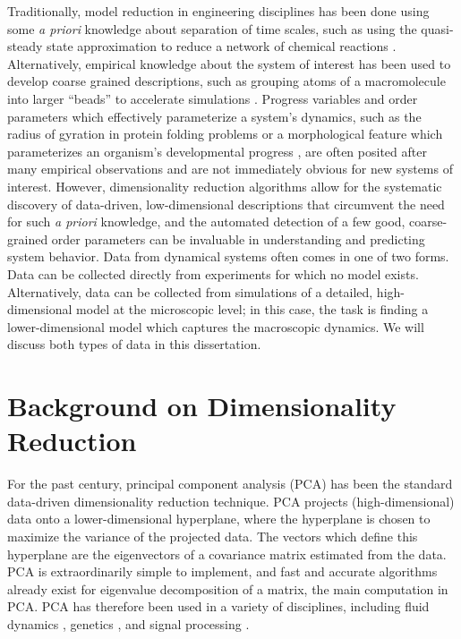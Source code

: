 Traditionally, model reduction in engineering disciplines has been done using some {\em a priori} knowledge about separation of time scales,
such as using the quasi-steady state approximation to reduce a network of chemical reactions \cite{bowen1963singular}.
%
Alternatively, empirical knowledge about the system of interest has been used to develop coarse grained descriptions, such as grouping atoms of a macromolecule into larger ``beads'' to accelerate simulations \cite{izvekov2005systematic, monticelli2008martini, saunders2013coarse, spiga2013electrostatic}.
%
Progress variables and order parameters which effectively parameterize a system's dynamics, such as the radius of gyration in protein folding problems \cite{lazaridis1997new, kim2015systematic} or a  morphological feature which parameterizes an organism's developmental progress \cite{dubuis2013accurate, hamaratoglu2011dpp}, are often posited after many empirical observations and are not immediately obvious for new systems of interest.
%
However, dimensionality reduction algorithms allow for the systematic discovery of data-driven, low-dimensional descriptions that circumvent the need for such {\em a priori} knowledge, and the automated detection of a few good, coarse-grained
order parameters can be invaluable in understanding and predicting system behavior.
%
%
Data from dynamical systems often comes in one of two forms.
%
Data can be collected directly from experiments for which no model exists.
%
Alternatively, data can be collected from simulations of a detailed, high-dimensional model at the microscopic level; in this case, the task is finding a lower-dimensional model which captures the macroscopic dynamics.
%
We will discuss both types of data in this dissertation.

\section{Background on Dimensionality Reduction} \label{sec:background}


For the past century, principal component analysis (PCA) \cite{shlens2005tutorial} has been the standard data-driven dimensionality reduction technique.
%
PCA projects (high-dimensional) data onto a lower-dimensional hyperplane, where the hyperplane is chosen to maximize the variance of the projected data.
%
The vectors which define this hyperplane are the eigenvectors of a covariance matrix estimated from the data.
%
PCA is extraordinarily simple to implement, and fast and accurate algorithms already exist for eigenvalue decomposition of a matrix, the main computation in PCA.
%
PCA has therefore been used in a variety of disciplines, including fluid dynamics \cite{rowley2004model, kunisch2002galerkin}, genetics \cite{alter2000singular, troyanskaya2001missing}, and signal processing \cite{vaseghi2008advanced}.

